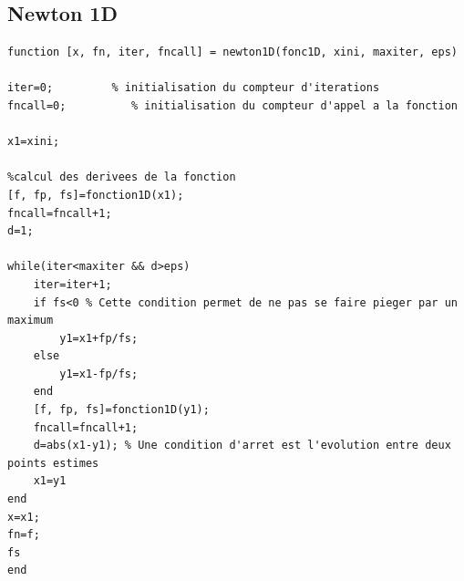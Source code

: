 \documentclass[twocolumn,10pt,a4paper]{article}
\begin{document}
\subsection{Newton 1D}
\begin{lstlisting} 
function [x, fn, iter, fncall] = newton1D(fonc1D, xini, maxiter, eps)

iter=0;         % initialisation du compteur d'iterations
fncall=0;          % initialisation du compteur d'appel a la fonction

x1=xini;

%calcul des derivees de la fonction
[f, fp, fs]=fonction1D(x1);
fncall=fncall+1;
d=1;

while(iter<maxiter && d>eps)
    iter=iter+1;
    if fs<0 % Cette condition permet de ne pas se faire pieger par un maximum
        y1=x1+fp/fs;
    else
        y1=x1-fp/fs;
    end
    [f, fp, fs]=fonction1D(y1);
    fncall=fncall+1;
    d=abs(x1-y1); % Une condition d'arret est l'evolution entre deux points estimes
    x1=y1
end
x=x1;
fn=f;
fs
end

\end{lstlisting} 
\end{document}
